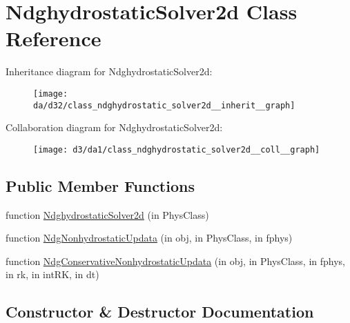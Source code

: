 \hypertarget{class_ndghydrostatic_solver2d}{}\section{Ndghydrostatic\+Solver2d Class Reference}
\label{class_ndghydrostatic_solver2d}


Inheritance diagram for Ndghydrostatic\+Solver2d\+:
\nopagebreak
\begin{figure}[H]
\begin{center}
\leavevmode
\texttt{[image: da/d32/class\_ndghydrostatic\_solver2d\_\_inherit\_\_graph]}
\end{center}
\end{figure}


Collaboration diagram for Ndghydrostatic\+Solver2d\+:
\nopagebreak
\begin{figure}[H]
\begin{center}
\leavevmode
\texttt{[image: d3/da1/class\_ndghydrostatic\_solver2d\_\_coll\_\_graph]}
\end{center}
\end{figure}
\subsection*{Public Member Functions}
\begin{DoxyCompactItemize}
\item 
function \hyperlink{class_ndghydrostatic_solver2d_adc6096a7ae4cfdc29cbba91fb990c234}{Ndghydrostatic\+Solver2d} (in Phys\+Class)
\item 
function \hyperlink{class_ndghydrostatic_solver2d_a7bd00be96fa94e1bcbdd7928764b137c}{Ndg\+Nonhydrostatic\+Updata} (in obj, in Phys\+Class, in fphys)
\item 
function \hyperlink{class_ndghydrostatic_solver2d_ac1b02691a4d48c802a1e07ba9b96eab1}{Ndg\+Conservative\+Nonhydrostatic\+Updata} (in obj, in Phys\+Class, in fphys, in rk, in int\+RK, in dt)
\end{DoxyCompactItemize}


\subsection{Constructor \& Destructor Documentation}
\mbox{\label{class_ndghydrostatic_solver2d_adc6096a7ae4cfdc29cbba91fb990c234}} 
